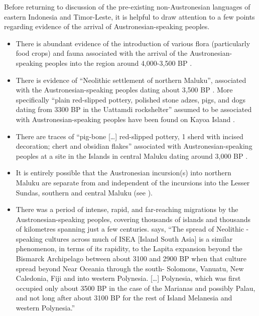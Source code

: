 Before returning to discussion of the pre-existing non-Austronesian languages of eastern
Indonesia and Timor-Leste, it is helpful to draw attention to a few points
regarding evidence of the arrival of Austronesian-speaking peoples.

\begin{itemize}
	\item There is abundant evidence of the introduction of various flora (particularly
				food crops) and fauna associated with the arrival of the Austronesian-speaking peoples
				into the region around 4,000-3,500 BP \citep{Bellwood2007}.
	\item There is evidence of “Neolithic settlement of northern Maluku”,
				associated with the Austronesian-speaking peoples dating about 3,500 BP \citep[514]{Spriggs2011}.
				More specifically “plain red-slipped pottery,
				polished stone adzes, pigs,
				and dogs dating from 3300 BP in the Uattamdi rockshelter”
				assumed to be associated with Austronesian-speaking
				peoples have been found on Kayoa Island \citep[218]{Bellwood2019a}.
	\item There are traces of “pig-bone [{\ldots}] red-slipped pottery,
				1 sherd with incised decoration; chert
				and obsidian flakes” associated with Austronesian-speaking peoples at a site in the  Islands in
				central Maluku dating around 3,000 BP \citep[520--521]{Spriggs2011}.
	\item It is entirely possible that the Austronesian incursion(s) into northern Maluku are separate from
				and independent of the incursions into the Lesser Sundas,
				southern and central Maluku (see ).
	\item There was a period of intense,
				rapid, and far-reaching migrations by the Austronesian-speaking peoples,
				covering thousands of islands
				and thousands of kilometres spanning just a few centuries.
				\citet[520--521]{Spriggs2011} says,
				“The spread of Neolithic -speaking cultures across much of ISEA
				[Island South Asia] is a similar phenomenon,
				in terms of its rapidity,
				to the Lapita expansion beyond the Bismarck Archipelago between about 3100
				and 2900 BP when that culture spread beyond Near Oceania
				through the south- Solomons,
				Vanuatu, New Caledonia, Fiji
				and into western Polynesia.
				[{\ldots}] Polynesia, which was first occupied only
				about 3500 BP in the case of the Marianas
				and possibly Palau, and not long after about 3100 BP
				for the rest of Island Melanesia
				and western Polynesia.”
\end{itemize}

